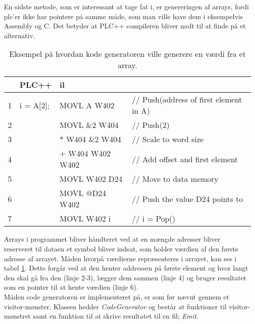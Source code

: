 {

\noindent En sidste metode, som er interessant at tage fat i, er genereringen af arrays, fordi \gls{plc}'er ikke har pointere på samme måde, som man ville have dem i eksempelvis Assembly og C. Det betyder at PLC++ compileren bliver nødt til at finde på et alternativ.

\begin{table}[H]
    \centering\ttfamily
    \begin{tabular}{l|l|l l}
         &PLC++       & \gls{il} \\\hline
        1&i = A[2];   & MOVL A W402       &// Push(address of first element in A)\\
        2&            & MOVL \&2 W404     &// Push(2)\\
        3&            & * W404 \&2 W404   &// Scale to word size\\
        4&            & + W404 W402 W402  &// Add offset and first element\\
        5&            & MOVL W402 D24     &// Move to data memory\\
        6&            & MOVL @D24 W402    &// Push the value D24 points to\\
        7&            & MOVL W402 i       &// i = Pop()
    \end{tabular}
    \caption{Eksempel på hvordan kode generatoren ville generere en værdi fra et array.}
    \label{tab:codegenArray}
\end{table}

\noindent Arrays i programmet bliver håndteret ved at en mængde adresser bliver reserveret til dataen et symbol bliver indsat, som holder værdien af den første adresse af arrayet. Måden hvorpå værdierne repræsenteres i arrayet, kan ses i tabel \ref{tab:codegenArray}. Dette forgår ved at den henter addressen på første element og hvor langt den skal gå fra den (linje 2-3), lægger dem sammen (linje 4) og bruger resultatet som en pointer til at hente værdien (linje 6).\\

\noindent Måden code generatoren er implementeret på, er som før nævnt gennem et visitor-mønster. Klassen hedder \textit{CodeGenerator} og består at funktioner til visitor-mønstret samt en funktion til at skrive resultatet til en fil; \textit{Emit}.

}
